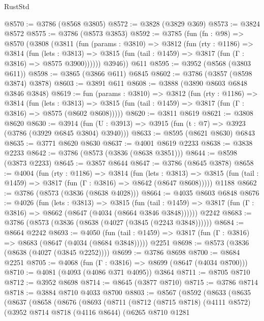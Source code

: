 \begin{lexlean}{RustStd}
\begin{coremodule}
@8570 := @3786 (@8568 @3805)
@8572 := @3828 (@3829 @369)
@8573 := @3824 @8572
@8575 := @3786 (@8573 @3853)
@8592 := @3785
    (fun (fn : @98) =>
    @8570
      (@3808
        (@3811
          (fun (params : @3810) =>
          @3812
            (fun (rty : @1186) =>
            @3814
              (fun (lets : @3813) =>
              @3815 (fun (tail : @1459) => @3817 (fun (Γ : @3816) => @8575 @3900))))))
        @3946))
    @611
@8595 := @3952 (@8568 (@3803 @611))
@8598 := @3865 (@3866 @611) @6845
@8602 := @3786 (@3857 (@8598 @3874) @3878)
@8603 := @3891 @611
@8608 := @3888 (@3890 @8603 @6848 @3846 @3848)
@8619 := fun (params : @3810) =>
  @3812
    (fun (rty : @1186) =>
    @3814
      (fun (lets : @3813) =>
      @3815 (fun (tail : @1459) => @3817 (fun (Γ : @3816) => @8575 (@8602 @8608)))))
@8620 := @3811 @8619
@8621 := @3808 @8620
@8630 := @3914 (fun (U : @3913) => @3915 (fun (t : @7) => @3923 (@3786 (@3929 @6845 @3804) @3940)))
@8633 := @8595 (@8621 @8630) @6843
@8635 := @3771 @8620 @8630
@8637 := @4001 @8619 @2233
@8638 := @3838 @2233
@8642 := @3786 (@8573 (@3836 (@8638 @3851)))
@8644 := @8598 (@3873 @2233)
@8645 := @3857 @8644
@8647 := @3786 (@8645 @3878)
@8658 := @4004
    (fun (rty : @1186) =>
    @3814
      (fun (lets : @3813) =>
      @3815 (fun (tail : @1459) => @3817 (fun (Γ : @3816) => @8642 (@8647 @8608)))))
    @1188
@8662 := @3786 (@8573 (@3836 (@8638 @4028)))
@8664 := @4035 @8603 @6848
@8676 := @4026
    (fun (lets : @3813) =>
    @3815
      (fun (tail : @1459) => @3817 (fun (Γ : @3816) => @8662 (@8647 (@4034 (@8664 @3846 @3848))))))
    @2242
@8683 := @3786 (@8573 (@3836 (@8638 (@4027 (@3845 (@2243 @3848))))))
@8684 := @8664 @2242
@8693 := @4050
    (fun (tail : @1459) => @3817 (fun (Γ : @3816) => @8683 (@8647 (@4034 (@8684 @3848)))))
    @2251
@8698 := @8573 (@3836 (@8638 (@4027 (@3845 @2252))))
@8699 := @3786 @8698
@8700 := @8684 @2251
@8705 := @4068 (fun (Γ : @3816) => @8699 (@8647 (@4034 @8700)))
@8710 := @4081 (@4093 (@4086 @371 @4095)) @3864
@8711 := @8705 @8710
@8712 := @3952 @8698
@8714 := @8645 (@3877 @8710)
@8715 := @3786 @8714
@8718 := @3884 @8710 @4033 @8700
@8803 := @8567
    (@8592
      (@8633
        (@8635
          (@8637
            (@8658
              (@8676
                (@8693
                  (@8711
                    (@8712
                      (@8715 @8718)
                      (@4111 @8572)
                      (@3952
                        @8714
                        @8718
                        (@4116 @8644)
                        (@6265
                          @8710
                          @1281

\end{coremodule}
\end{lexlean}
